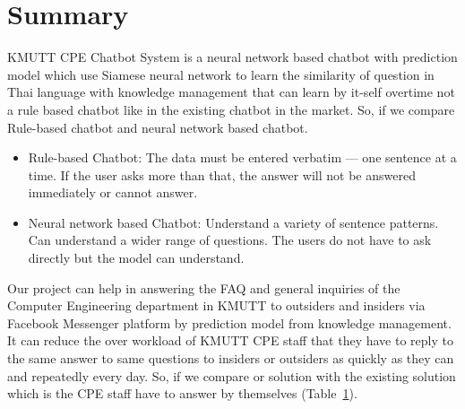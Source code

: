 \documentclass[12pt,oneside,openright,a4paper]{cpe-english-project}
\begin{document}
\section{Summary}
KMUTT CPE Chatbot System is a neural network based chatbot with prediction model which use
Siamese neural network to learn the similarity of question in Thai language with knowledge
management that can learn by it-self overtime not a rule based chatbot like in the existing
chatbot in the market. So, if we compare Rule-based chatbot and neural network based chatbot.
\begin{itemize}
  \item Rule-based Chatbot: The data must be entered verbatim — one sentence at a time. If the
  user asks more than that, the answer will not be answered immediately or cannot answer.
  \item Neural network based Chatbot: Understand a variety of sentence patterns. Can understand
  a wider range of questions. The users do not have to ask directly but the model can understand.
\end{itemize}
Our project can help in answering the FAQ and general inquiries of the Computer Engineering
department in KMUTT to outsiders and insiders via Facebook Messenger platform by prediction
model from knowledge management. It can reduce the over workload of KMUTT CPE staff that they
have to reply to the same answer to same questions to insiders or outsiders as quickly as they
can and repeatedly every day. So, if we compare or solution with the existing solution which is
the CPE staff have to answer by themselves (Table~\ref*{table:ch3_solution_compare}).
\begin{figure}[h!]
  \centering
  \label{table:ch3_solution_compare}
\end{figure}
\end{document}
